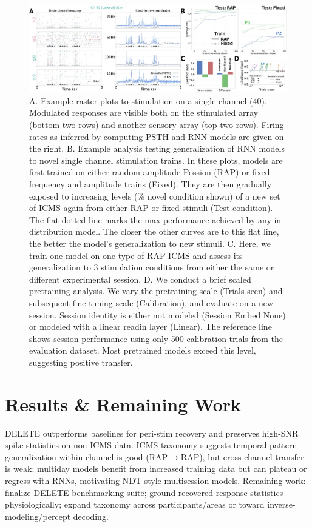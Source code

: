 \documentclass[12pt,oneside]{report}
\begin{document}
\begin{figure}[h]
  \centering
  \includegraphics[width=0.5\linewidth]{ch4_icms_taxonomy.png}
  \caption{A. Example raster plots to stimulation on a single channel (40). Modulated responses are visible both on the stimulated array (bottom two rows) and another sensory array (top two rows). Firing rates as inferred by computing PSTH and RNN models are given on the right. B. Example analysis testing generalization of RNN models to novel single channel stimulation trains. In these plots, models are first trained on either random amplitude Possion (RAP) or fixed frequency and amplitude trains (Fixed). They are then gradually exposed to increasing levels (\% novel condition shown) of a new set of ICMS again from either RAP or fixed stimuli (Test condition). The flat dotted line marks the max performance achieved by any in-distribution model. The closer the other curves are to this flat line, the better the model's generalization to new stimuli. C. Here, we train one model on one type of RAP ICMS and assess its generalization to 3 stimulation conditions from either the same or different experimental session. D. We conduct a brief scaled pretraining analysis. We vary the pretraining scale (Trials seen) and subsequent fine-tuning scale (Calibration), and evaluate on a new session. Session identity is either not modeled (Session Embed None) or modeled with a linear readin layer (Linear). The reference line shows session performance using only 500 calibration trials from the evaluation dataset. Most pretrained models exceed this level, suggesting positive transfer.}
  \label{fig:icms_taxonomy}
\end{figure}

\section{Results \& Remaining Work}
DELETE outperforms baselines for peri-stim recovery and preserves high-SNR spike statistics on non-ICMS data. ICMS taxonomy suggests temporal-pattern generalization within-channel is good (RAP$\to$RAP), but cross-channel transfer is weak; multiday models benefit from increased training data but can plateau or regress with RNNs, motivating NDT-style multisession models. Remaining work: finalize DELETE benchmarking suite; ground recovered response statistics physiologically; expand taxonomy across participants/areas or toward inverse-modeling/percept decoding.
\end{document}
